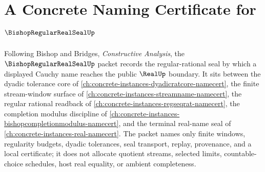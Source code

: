 \chapter{A Concrete Naming Certificate for $\BishopRegularRealSealUp$}
\label{ch:concrete-instances-bishop-regular-real-seal-namecert}

Following Bishop and Bridges, \emph{Constructive Analysis}, the $\BishopRegularRealSealUp$ packet records the regular-rational seal by which a displayed Cauchy name reaches the public $\RealUp$ boundary. It sits between the dyadic tolerance core of \autoref{ch:concrete-instances-dyadicratcore-namecert}, the finite stream-window surface of \autoref{ch:concrete-instances-streamname-namecert}, the regular rational readback of \autoref{ch:concrete-instances-regseqrat-namecert}, the completion modulus discipline of \autoref{ch:concrete-instances-bishopcompletionmodulus-namecert}, and the terminal real-name seal of \autoref{ch:concrete-instances-real-namecert}. The packet names only finite windows, regularity budgets, dyadic tolerances, seal transport, replay, provenance, and a local certificate; it does not allocate quotient streams, selected limits, countable-choice schedules, host real equality, or ambient completeness.

